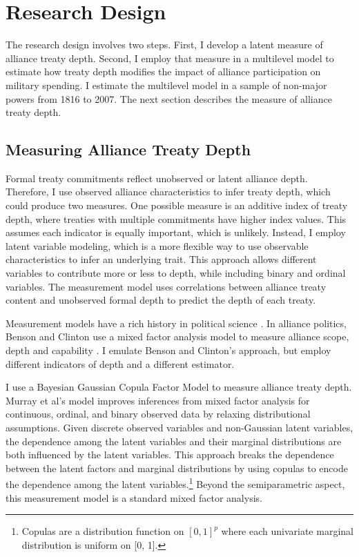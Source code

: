 \documentclass[12pt]{article}
\begin{document}
\section*{Research Design} 


The research design involves two steps. 
First, I develop a latent measure of alliance treaty depth. 
Second, I employ that measure in a multilevel model to estimate how treaty depth modifies the impact of alliance participation on military spending. 
I estimate the multilevel model in a sample of non-major powers from 1816 to 2007. 
The next section describes the measure of alliance treaty depth. 


\subsection*{Measuring Alliance Treaty Depth} 


Formal treaty commitments reflect unobserved or latent alliance depth. 
Therefore, I use observed alliance characteristics to infer treaty depth, which could produce two measures. 
One possible measure is an additive index of treaty depth, where treaties with multiple commitments have higher index values. 
This assumes each indicator is equally important, which is unlikely. 
Instead, I employ latent variable modeling, which is a more flexible way to use observable characteristics to infer an underlying trait. 
This approach allows different variables to contribute more or less to depth, while including binary and ordinal variables.  
The measurement model uses correlations between alliance treaty content and unobserved formal depth to predict the depth of each treaty. 


Measurement models have a rich history in political science \citep{Clintonetal2004, TreierJackman2008, Fariss2014}.
In alliance politics, Benson and Clinton use a mixed factor analysis model to measure alliance scope, depth and capability \citep{BensonClinton2016, Quinn2004}.  
I emulate Benson and Clinton's approach, but employ different indicators of depth and a different estimator. 


I use a Bayesian Gaussian Copula Factor Model \citep{Murrayetal2013} to measure alliance treaty depth. 
Murray et al's model improves inferences from mixed factor analysis for continuous, ordinal, and binary observed data by relaxing distributional assumptions. 
Given discrete observed variables and non-Gaussian latent variables, the dependence among the latent variables and their marginal distributions are both influenced by the latent variables.
This approach breaks the dependence between the latent factors and marginal distributions by using copulas to encode the dependence among the latent variables.\footnote{Copulas are a distribution function on $[0, 1]^p$ where each univariate marginal distribution is uniform on [0, 1].}
Beyond the semiparametric aspect, this measurement model is a standard mixed factor analysis.
\end{document}
